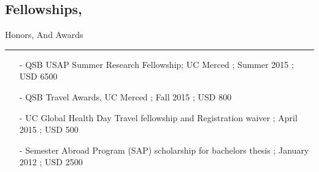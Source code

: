 \documentclass[line,margin]{resume_type2}
\begin{document}
\begin{resume}
\section{Fellowships,}\hskip 81pt {\large \sc Honors,} {\large \sc And }{\large \sc Awards}\hskip 4pt {\color {gray} \hfill \rule {9.8cm} {0.1pt}}
\vskip 3pt
                \begin{itemize}
                \item[- ]
                 {QSB USAP Summer Research Fellowship}; UC Merced ; Summer 2015 ; USD 6500
                 \vskip 1pt
                \item[- ]
                 {QSB Travel Awards}, UC Merced ; Fall 2015 ; USD 800
                 \vskip 1pt
                \item[- ]
                 {UC Global Health Day Travel fellowship and Registration waiver ; April 2015 ; USD 500}
                 \vskip 1pt
                \item[- ]
                 {Semester Abroad Program {\small(SAP)}} scholarship for bachelors thesis ; January 2012 ; USD 2500
                \end{itemize}
                
\end{resume}
\end{document}
